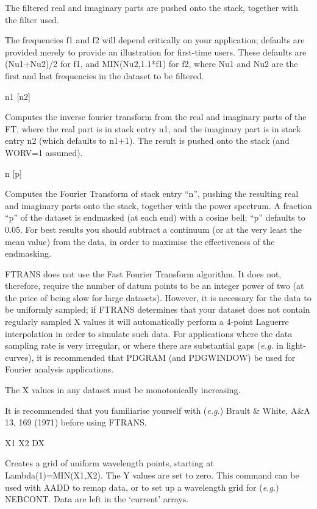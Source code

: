 \begin {description}
The filtered real and imaginary parts are pushed onto the stack,
together with the filter used.

The frequencies f1 and f2 will depend critically on your application;
defaults are provided merely to provide an illustration for first-time
users. These defaults are (Nu1+Nu2)/2 for f1, and MIN(Nu2,1.1*f1) for
f2, where Nu1 and Nu2 are the first and last frequencies in the
dataset to be filtered.

\item [FTINV] n1 [n2]

Computes the inverse fourier transform from the real and imaginary
parts of the FT, where the real part is in stack entry n1, and the
imaginary part is in stack entry n2 (which defaults to n1+1). The
result is pushed onto the stack (and WORV=1 assumed).

\item [FTRANS] n [p]

Computes the Fourier Transform of stack entry ``n'', pushing the
resulting real and imaginary parts onto the stack, together with the
power spectrum. A fraction ``p'' of the dataset is endmasked (at each
end) with a cosine bell;  ``p'' defaults to 0.05. For best results you
should subtract a continuum (or at the very least the mean value) from
the data, in order to maximise the effectiveness of the endmasking.

FTRANS does not use the Fast Fourier Transform algorithm. It does not,
therefore, require the number of datum points to be an integer power
of two (at the price of being slow for large datasets). However, it is
necessary for the data to be uniformly sampled;   if FTRANS determines
that your dataset does not contain regularly sampled X values it will
automatically perform a 4-point Laguerre interpolation in order to
simulate such data. For applications where the data sampling rate is
very irregular, or where there are substantial gaps ({\em e.g.} in
light-curves), it is recommended that PDGRAM (and PDGWINDOW) be used
for Fourier analysis applications.

The X values in any dataset must be monotonically increasing.

It is recommended that you  familiarise yourself with ({\em e.g.})
Brault \& White, A\&A 13, 169 (1971) before using FTRANS.

\item [GRID] X1 X2 DX

Creates a grid of uniform wavelength points, starting at
Lambda(1)=MIN(X1,X2). The Y values are set to zero. This command can
be used with AADD to remap data, or to set up a wavelength grid for
({\em e.g.}) NEBCONT. Data are left in the `current' arrays.


\end{description}
